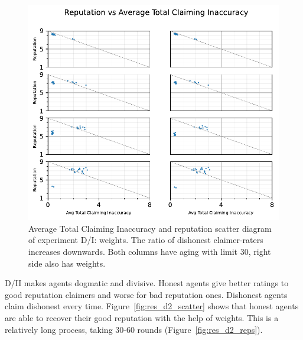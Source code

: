 \documentclass[%
    ]{\PathToTumTemplate/thesis/tum_thesis}
\begin{document}
\begin{figure}[tbp]
  \begin{center}
        \includegraphics[width=0.75\linewidth]	{../results/d/AvgTotClaimInaccuracyAndReputationScatter_joined.pdf}
    \caption{
    Average Total Claiming Inaccuracy and reputation scatter diagram of experiment D/I: weights.
    The ratio of dishonest claimer-raters increases downwards.
    Both columns have aging with limit 30, right side also has weights.
    }
    \label{fig:res_d_scatter}
  \end{center}
\end{figure}

D/II makes agents dogmatic and divisive.
Honest agents give better ratings to good reputation claimers and worse for bad reputation ones.
Dishonest agents claim dishonest every time.
Figure~\ref{fig:res_d2_scatter} shows that honest agents are able to recover their good reputation with the help of weights.
This is a relatively long process, taking 30-60 rounds (Figure~\ref{fig:res_d2_reps}).
\end{document}
